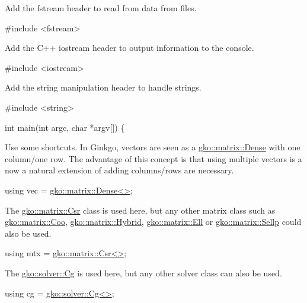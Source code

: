 Add the fstream header to read from data from files.


\begin{DoxyCode}
\textcolor{preprocessor}{#include <fstream>}
\end{DoxyCode}


Add the C++ iostream header to output information to the console.


\begin{DoxyCode}
\textcolor{preprocessor}{#include <iostream>}
\end{DoxyCode}


Add the string manipulation header to handle strings.


\begin{DoxyCode}
\textcolor{preprocessor}{#include <string>}


\textcolor{keywordtype}{int} main(\textcolor{keywordtype}{int} argc, \textcolor{keywordtype}{char} *argv[])
\{
\end{DoxyCode}


Use some shortcuts. In Ginkgo, vectors are seen as a \hyperlink{classgko_1_1matrix_1_1Dense}{gko\+::matrix\+::\+Dense} with one column/one row. The advantage of this concept is that using multiple vectors is a now a natural extension of adding columns/rows are necessary.


\begin{DoxyCode}
\textcolor{keyword}{using} vec = \hyperlink{classgko_1_1matrix_1_1Dense}{gko::matrix::Dense<>};
\end{DoxyCode}


The \hyperlink{classgko_1_1matrix_1_1Csr}{gko\+::matrix\+::\+Csr} class is used here, but any other matrix class such as \hyperlink{classgko_1_1matrix_1_1Coo}{gko\+::matrix\+::\+Coo}, \hyperlink{classgko_1_1matrix_1_1Hybrid}{gko\+::matrix\+::\+Hybrid}, \hyperlink{classgko_1_1matrix_1_1Ell}{gko\+::matrix\+::\+Ell} or \hyperlink{classgko_1_1matrix_1_1Sellp}{gko\+::matrix\+::\+Sellp} could also be used.


\begin{DoxyCode}
\textcolor{keyword}{using} mtx = \hyperlink{classgko_1_1matrix_1_1Csr}{gko::matrix::Csr<>};
\end{DoxyCode}


The \hyperlink{classgko_1_1solver_1_1Cg}{gko\+::solver\+::\+Cg} is used here, but any other solver class can also be used.


\begin{DoxyCode}
\textcolor{keyword}{using} cg = \hyperlink{classgko_1_1solver_1_1Cg}{gko::solver::Cg<>};
\end{DoxyCode}


